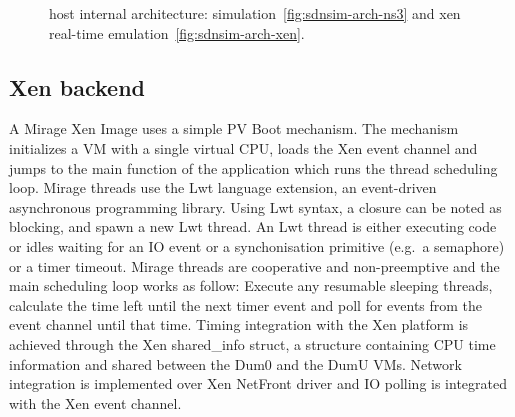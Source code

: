 \begin{figure}[ht]
\centering
{}
\caption{\sdnsim host internal architecture: 
  simulation~\ref{fig:sdnsim-arch-ns3} and xen real-time
  emulation~\ref{fig:sdnsim-arch-xen}.}
\label{fig:sdnsim-arch}
\end{figure}


\subsection{Xen backend}

A Mirage Xen Image uses a simple PV Boot mechanism. The mechanism initializes a
VM with a single virtual CPU, loads the Xen event channel and jumps to the main
function of the application which runs the thread scheduling loop.  Mirage
threads use the Lwt language extension, an event-driven asynchronous programming
library.  Using Lwt syntax, a closure can be noted as blocking, and spawn a new
Lwt thread.  An Lwt thread is either executing code or idles waiting for an IO
event or a synchonisation primitive (e.g.~a semaphore) or a timer timeout.
Mirage threads are cooperative and non-preemptive and the main scheduling loop
works as follow: Execute any resumable sleeping threads, calculate the time left
until the next timer event and poll for events from the event channel until that
time.  Timing integration with the Xen platform is achieved through the Xen
shared\_info struct, a structure containing CPU time information and shared
between the Dum0 and the DumU VMs.  Network integration is implemented over Xen
NetFront driver and IO polling is integrated with the Xen event channel.

